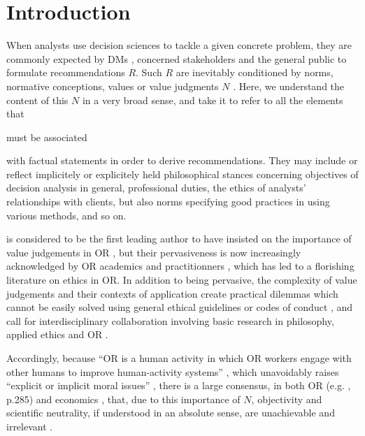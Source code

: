 \documentclass[preprint, french, english, 11pt, authoryear]{elsarticle}%
\begin{document}
\section{Introduction}
When analysts use decision sciences to tackle a given concrete problem, they are commonly expected by \acp{DM}
, concerned stakeholders and the general public to formulate recommendations $R$. 
Such $R$ are inevitably conditioned by norms, normative conceptions, values or value judgments $N$ \citep{funtowicz_science_1993,brans_ethics_2002,mingers_ethics_2011}.
Here, we understand the content of this $N$ in a very broad sense, and take it to refer to all the elements that \begin{changebar} must be associated \end{changebar}with factual statements in order to derive recommendations. 
They may include or reflect implicitely or explicitely held philosophical stances concerning objectives of decision analysis in general, professional duties, the ethics of analysts' relationships with clients, but also norms specifying good practices in using various methods, and so on.

\begin{changebar}
\citet{churchman_operations_1970} is considered to be the first leading author to have insisted on the importance of value judgements in \ac{OR} \citep{ormerod_operational_2013}, but their pervasiveness is now increasingly acknowledged by \ac{OR} academics and practitionners \citep{brans_ethics_2007}, which has led to a florishing literature on ethics in \ac{OR}. 
In addition to being pervasive, the complexity of value judgements and their contexts of application create practical dilemmas which cannot be easily solved using general ethical guidelines or codes of conduct \citep{taket_undercover_1994}, and call for interdisciplinary collaboration involving basic research in philosophy, applied ethics and \ac{OR} \citep{picavet_opportunities_2009}. \end{changebar}Accordingly, because ``\ac{OR}  
is a human activity in which \ac{OR} 
workers engage with other humans to improve human-activity systems'' \citep{ormerod_operational_2013}, which unavoidably raises ``explicit or implicit moral issues'' \citep{diekmann_moral_2013}, there is a large consensus, in both \ac{OR} 
(e.g. \citet{williams_2009}, p.285) and economics \citep{dwyer_scientific_1985, heath_value_1994, sen_rationality_2004, mongin_value_2006, baujard_value_2013},
that, due to this importance of $N$, objectivity and scientific neutrality, if understood in an absolute sense, are unachievable and irrelevant \citep{le_menestrel_ethics_2004,reisach_creation_2016}. 
\end{document}
